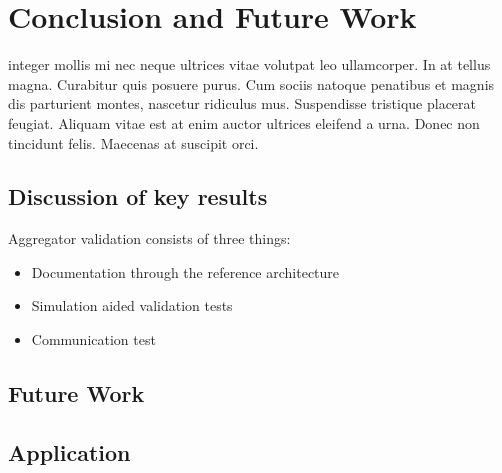 \chapter{Conclusion and Future Work}
\label{cha:conclusion}
 integer mollis mi nec neque ultrices vitae volutpat leo ullamcorper. In at tellus magna. Curabitur quis posuere purus. Cum sociis natoque penatibus et magnis dis parturient montes, nascetur ridiculus mus. Suspendisse tristique placerat feugiat. Aliquam vitae est at enim auctor ultrices eleifend a urna. Donec non tincidunt felis. Maecenas at suscipit orci.
\section{Discussion of key results} %
\label{sec:Discussionofkeyresults}


Aggregator validation consists of three things:
\begin{itemize}
	\item Documentation through the reference architecture
	\item Simulation aided validation tests
	\item Communication test
\end{itemize}


\section{Future Work} %
\label{sec:FutureWork}


\section{Application} %
\label{sec:Application}

